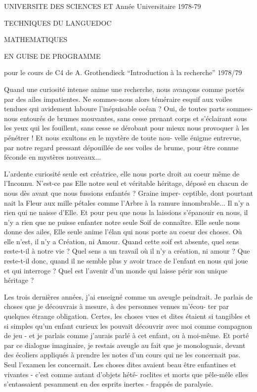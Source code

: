 UNIVERSITE DES SCIENCES ET \hfill Année Universitaire 1978-79

TECHNIQUES DU LANGUEDOC

MATHEMATIQUES

EN GUISE DE PROGRAMME

pour le cours de C4 de A. Grothendieck ``Introduction à la recherche'' 1978/79

Quand une curiosité intense anime une recherche, nous avançons comme
portés par des ailes impatientes. Ne sommes-nous alors téméraire esquif aux
voiles tendues qui avidement laboure l'inépuisable océan ? Oui, de toutes
parts sommes-nous entourés de brumes mouvantes, sans cesse prenant corps et
s'éclairant sous les yeux qui les fouillent, sans cesse se dérobant pour mieux
nous provoquer à les pénétrer ! Et nous exultons en le mystère de toute nou-%
velle énigme entrevue, par notre regard pressant dépouillée de ses voiles de
brume, pour être connue féconde en mystères nouveaux...

L'ardente curiosité seule est créatrice, elle nous porte droit au
coeur même de l'Inconnu. N'est-ce pas Elle notre seul et véritable héritage,
déposé en chacun de nous dès avant que nous fussions enfantés ? Graine imper-%
ceptible, dont pourtant nait la Fleur aux mille pétales comme l'Arbre à la
ramure innombrable... Il n'y a rien qui ne naisse d'Elle. Et pour peu que nous
la laissions s'épanouir en nous, il n'y a rien que ne puisse enfanter notre
seule Soif de connaître. Elle seule nous donne des ailes, Elle seule anime
l'élan qui nous porte au coeur des choses. Où elle n'est, il n'y a Création,
ni Amour.
Quand cette soif est absente, quel sens reste-t-il à notre vie ?
Quel sens a un travail où il n'y a création, ni amour ? Que reste-t-il donc,
quand il ne semble plus y avoir trace de l'enfant en nous qui joue et qui
interroge ? Quel est l'avenir d'un monde qui laisse périr son unique héritage ?

Les trois dernières années, j'ai enseigné comme un aveugle peindrait.
Je parlais de choses que je découvrais à mesure, à des personnes venues m'écou-%
ter par quelques étrange obligation. Certes, les choses vues et dites étaient
si tangibles et si simples qu'un enfant curieux les pouvait découvrir avec moi
comme compagnon de jeu - et je parlais comme j'aurais parlé à cet enfant, ou
à moi-même. Et porté par ce dialogue imaginaire, je restais aveugle au fait que
je monologuais, devant des écoliers appliqués à prendre les notes d'un cours
qui ne les concernait pas. Seul l'examen les concernait. Les choses dites
avaient beau être enfantines et vivantes - c'est comme autant d'objets hété-%
roclites et morts que pêle-mêle elles s'entassaient pesamment en des esprits
inertes - frappés de paralysie.

